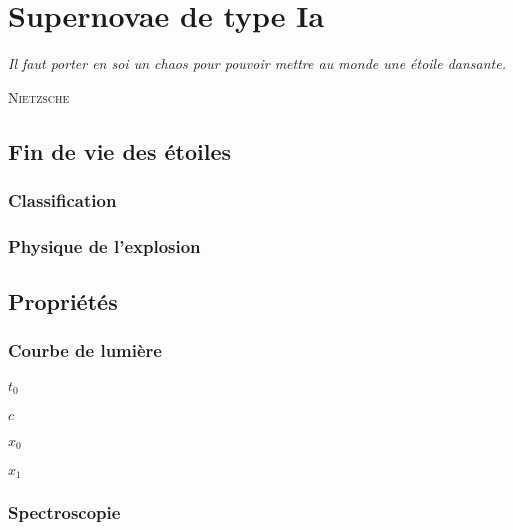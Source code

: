 \documentclass[../main/main.tex]{subfiles}
\begin{document}
\chapter{Supernovae de type Ia}\label{ch:sne}

\epigraph{\openquote\textit{Il faut porter en soi un chaos pour pouvoir mettre
au monde une étoile dansante.}\closequote}{\textsc{Nietzsche}}

\minitoc
\newpage

\section{Fin de vie des étoiles}\label{sec:death}

\subsection{Classification}\label{ssec:class}

\subsection{Physique de l'explosion}\label{ssec:explo}

\section{Propriétés}\label{sec:sneprop}

\subsection{Courbe de lumière}\label{ssec:lc}
\subsubsection*{$t_0$}
\subsubsection*{$c$}
\subsubsection*{$x_0$}
\subsubsection*{$x_1$}

\subsection{Spectroscopie}\label{ssec:spectro}
\end{document}
